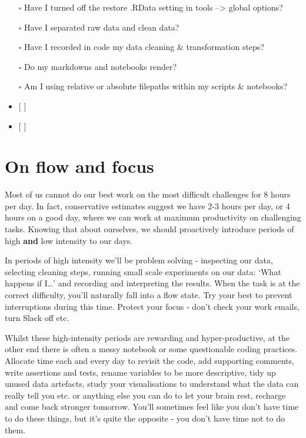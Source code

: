 \documentclass[
  letterpaper,
  DIV=11,
  numbers=noendperiod]{scrreprt}
\providecommand{\tightlist}{%
  \setlength{\itemsep}{0pt}\setlength{\parskip}{0pt}}\usepackage{longtable,booktabs,array}
\begin{document}
\begin{itemize}
\tightlist
\item[$\square$]
  Have I turned off the restore .RData setting in tools --\textgreater{}
  global options?
\item[$\square$]
  Have I separated raw data and clean data?
\item[$\square$]
  Have I recorded in code my data cleaning \& transformation steps?
\item[$\square$]
  Do my markdowns and notebooks render?
\item[$\square$]
  Am I using relative or absolute filepaths within my scripts \&
  notebooks?
\item
  {[} {]}
\item
  {[} {]}
\end{itemize}

\section{On flow and focus}\label{on-flow-and-focus}

Most of us cannot do our best work on the most difficult challenges for
8 hours per day. In fact, conservative estimates suggest we have 2-3
hours per day, or 4 hours on a good day, where we can work at maximum
productivity on challenging tasks. Knowing that about ourselves, we
should proactively introduce periods of high \textbf{and} low intensity
to our days.

In periods of high intensity we'll be problem solving - inspecting our
data, selecting cleaning steps, running small scale experiments on our
data: `What happens if I\ldots{}' and recording and interpreting the
results. When the task is at the correct difficulty, you'll naturally
fall into a flow state. Try your best to prevent interruptions during
this time. Protect your focus - don't check your work emails, turn Slack
off etc.

Whilst these high-intensity periods are rewarding and hyper-productive,
at the other end there is often a messy notebook or some questionable
coding practices. Allocate time each and every day to revisit the code,
add supporting comments, write assertions and tests, rename variables to
be more descriptive, tidy up unused data artefacts, study your
visualisations to understand what the data can really tell you etc. or
anything else you can do to let your brain rest, recharge and come back
stronger tomorrow. You'll sometimes feel like you don't have time to do
these things, but it's quite the opposite - you don't have time not to
do them.
\end{document}
